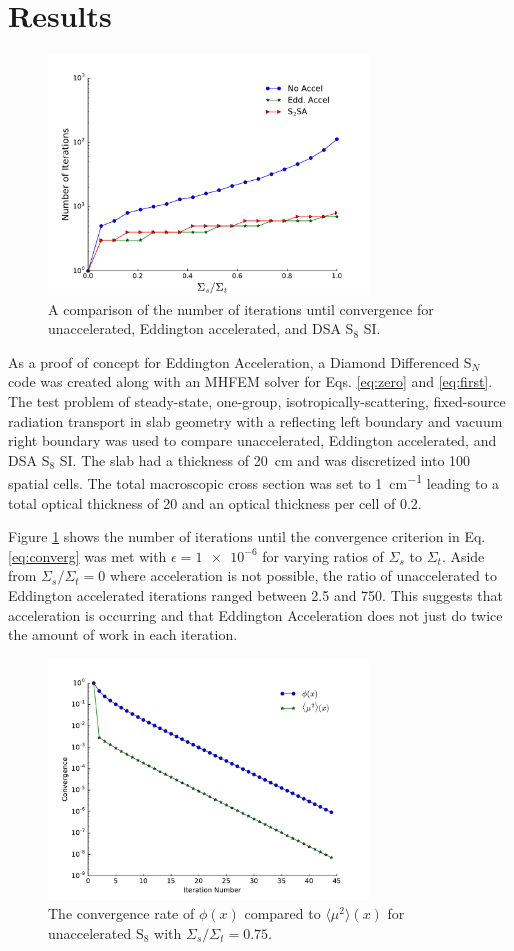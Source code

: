 \documentclass{anstrans}
\newcommand{\SN}{S$_N$\xspace}
\newcommand{\edd}{\langle \mu^2 \rangle}
\begin{document}
\section{Results}
	\begin{figure}
		\centering
		\includegraphics[width=8.5cm]{figs/accel.pdf}
		\caption{A comparison of the number of iterations until convergence for unaccelerated, Eddington accelerated, and DSA S$_8$ SI. }
		\label{fig:comparison}
	\end{figure}

	As a proof of concept for Eddington Acceleration, a Diamond Differenced \SN code was created along with an MHFEM solver for Eqs. \ref{eq:zero} and \ref{eq:first}. The test problem of steady-state, one-group, isotropically-scattering, fixed-source radiation transport in slab geometry with a reflecting left boundary and vacuum right boundary was used to compare unaccelerated, Eddington accelerated, and DSA S$_8$ SI. The slab had a thickness of \SI{20}{cm} and was discretized into 100 spatial cells. The total macroscopic cross section was set to \SI{1}{cm^{-1}} leading to a total optical thickness of 20 and an optical thickness per cell of 0.2. 

	Figure \ref{fig:comparison} shows the number of iterations until the convergence criterion in  Eq. \ref{eq:converg} was met with $\epsilon = \num{1e-6}$ for varying ratios of $\Sigma_s$ to $\Sigma_t$. Aside from $\Sigma_s/\Sigma_t = 0$ where acceleration is not possible, the ratio of unaccelerated to Eddington accelerated iterations ranged between 2.5 and 750. This suggests that acceleration is occurring and that Eddington Acceleration does not just do twice the amount of work in each iteration. 

	\begin{figure}
		\centering
		\includegraphics[width=8.5cm]{figs/eddCon_si.pdf}
		\caption{The convergence rate of $\phi(x)$ compared to $\edd(x)$ for unaccelerated S$_8$ with $\Sigma_s/\Sigma_t = 0.75$. }
		\label{fig:conv_si}
	\end{figure}
\end{document}
